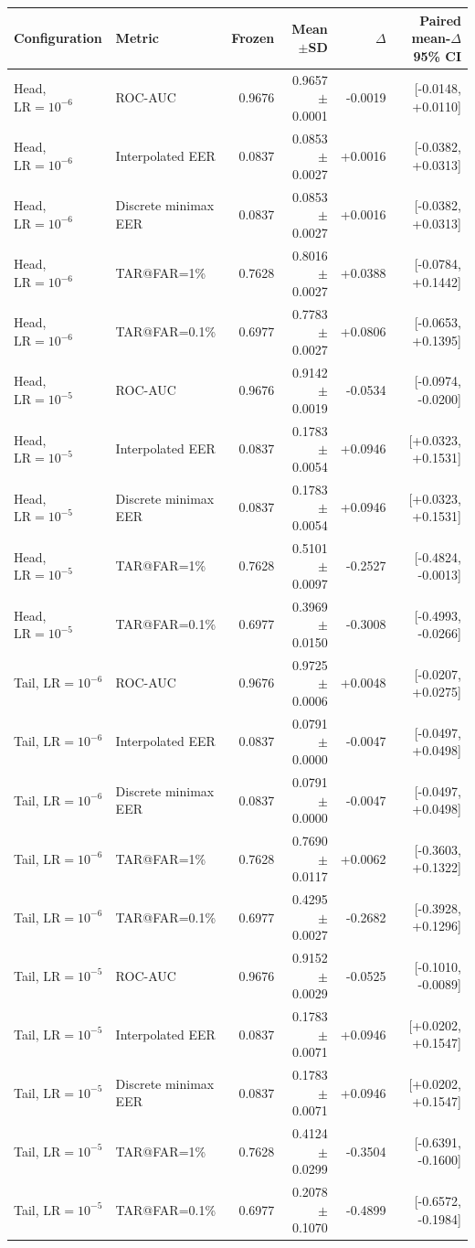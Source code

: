 \begin{tabular}{llrrrr}
\toprule
Configuration & Metric & Frozen & Mean$\pm$SD & $\Delta$ & Paired mean-$\Delta$ 95\% CI \\
\midrule
Head, $\mathrm{LR}=10^{-6}$ & ROC-AUC & 0.9676 & 0.9657$\pm$0.0001 & -0.0019 & [-0.0148, +0.0110] \\
Head, $\mathrm{LR}=10^{-6}$ & Interpolated EER & 0.0837 & 0.0853$\pm$0.0027 & +0.0016 & [-0.0382, +0.0313] \\
Head, $\mathrm{LR}=10^{-6}$ & Discrete minimax EER & 0.0837 & 0.0853$\pm$0.0027 & +0.0016 & [-0.0382, +0.0313] \\
Head, $\mathrm{LR}=10^{-6}$ & TAR@FAR=1\% & 0.7628 & 0.8016$\pm$0.0027 & +0.0388 & [-0.0784, +0.1442] \\
Head, $\mathrm{LR}=10^{-6}$ & TAR@FAR=0.1\% & 0.6977 & 0.7783$\pm$0.0027 & +0.0806 & [-0.0653, +0.1395] \\
Head, $\mathrm{LR}=10^{-5}$ & ROC-AUC & 0.9676 & 0.9142$\pm$0.0019 & -0.0534 & [-0.0974, -0.0200] \\
Head, $\mathrm{LR}=10^{-5}$ & Interpolated EER & 0.0837 & 0.1783$\pm$0.0054 & +0.0946 & [+0.0323, +0.1531] \\
Head, $\mathrm{LR}=10^{-5}$ & Discrete minimax EER & 0.0837 & 0.1783$\pm$0.0054 & +0.0946 & [+0.0323, +0.1531] \\
Head, $\mathrm{LR}=10^{-5}$ & TAR@FAR=1\% & 0.7628 & 0.5101$\pm$0.0097 & -0.2527 & [-0.4824, -0.0013] \\
Head, $\mathrm{LR}=10^{-5}$ & TAR@FAR=0.1\% & 0.6977 & 0.3969$\pm$0.0150 & -0.3008 & [-0.4993, -0.0266] \\
Tail, $\mathrm{LR}=10^{-6}$ & ROC-AUC & 0.9676 & 0.9725$\pm$0.0006 & +0.0048 & [-0.0207, +0.0275] \\
Tail, $\mathrm{LR}=10^{-6}$ & Interpolated EER & 0.0837 & 0.0791$\pm$0.0000 & -0.0047 & [-0.0497, +0.0498] \\
Tail, $\mathrm{LR}=10^{-6}$ & Discrete minimax EER & 0.0837 & 0.0791$\pm$0.0000 & -0.0047 & [-0.0497, +0.0498] \\
Tail, $\mathrm{LR}=10^{-6}$ & TAR@FAR=1\% & 0.7628 & 0.7690$\pm$0.0117 & +0.0062 & [-0.3603, +0.1322] \\
Tail, $\mathrm{LR}=10^{-6}$ & TAR@FAR=0.1\% & 0.6977 & 0.4295$\pm$0.0027 & -0.2682 & [-0.3928, +0.1296] \\
Tail, $\mathrm{LR}=10^{-5}$ & ROC-AUC & 0.9676 & 0.9152$\pm$0.0029 & -0.0525 & [-0.1010, -0.0089] \\
Tail, $\mathrm{LR}=10^{-5}$ & Interpolated EER & 0.0837 & 0.1783$\pm$0.0071 & +0.0946 & [+0.0202, +0.1547] \\
Tail, $\mathrm{LR}=10^{-5}$ & Discrete minimax EER & 0.0837 & 0.1783$\pm$0.0071 & +0.0946 & [+0.0202, +0.1547] \\
Tail, $\mathrm{LR}=10^{-5}$ & TAR@FAR=1\% & 0.7628 & 0.4124$\pm$0.0299 & -0.3504 & [-0.6391, -0.1600] \\
Tail, $\mathrm{LR}=10^{-5}$ & TAR@FAR=0.1\% & 0.6977 & 0.2078$\pm$0.1070 & -0.4899 & [-0.6572, -0.1984] \\
\bottomrule
\end{tabular}

